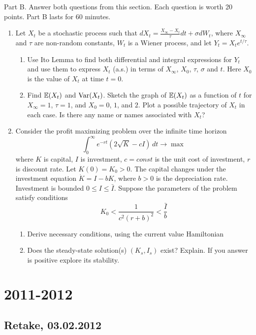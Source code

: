 \documentclass[pdftex,12pt,a4paper]{article}
\begin{document}
Part B.
Answer both questions from this section. Each question is worth 20 points.
Part B lasts for 60 minutes.
\begin{enumerate}
\item Let $X_t$ be a stochastic process such that
$dX_t=\frac{X_{\infty}-X_t}{\tau}dt+\sigma dW_t$, where $X_{\infty}$ and $\tau$ are non-random constants, $W_t$ is a Wiener process, and let $Y_t=X_t e^{t/\tau}$.
\begin{enumerate}
\item Use Ito Lemma to find both differential and integral expressions for $Y_t$ and use them to express $X_t$ (a.s.) in terms of $X_{\infty}$, $X_0$, $\tau$, $\sigma$ and $t$. Here $X_0$ is the value of $X_t$ at time $t=0$.
\item Find $\mathbb{E}(X_t)$ and $\operatorname{Var}(X_t)$. Sketch the graph of $\mathbb{E}(X_t)$ as a function of $t$ for $X_{\infty}=1$, $\tau=1$, and $X_0 = 0$, $1$, and $2$. Plot a possible trajectory of $X_t$ in each case. Is there any name or names associated with $X_t$? 
\end{enumerate}

\item Consider the profit maximizing problem over the infinite time horizon
\[
\int_0^{\infty} e^{-rt}(2\sqrt{K}-cI)\, dt \to \max
\]
where $K$ is capital, $I$ is investment, $c=const$ is the unit cost of investment, $r$ is discount rate. Let $K(0)=K_0>0$. The capital changes under the investment equation $\dot{K}=I-bK$, where $b>0$ is the depreciation rate. Investment is bounded $0\leq I\leq \bar{I}$. Suppose the parameters of the problem satisfy conditions
\[
K_0 < \frac{1}{c^2(r+b)^2} < \frac{\bar{I}}{b}
\]
\begin{enumerate}
\item Derive necessary conditions, using the current value Hamiltonian
\item Does the steady-state solution(s) $(K_s,I_s)$ exist? Explain. If you answer is positive explore its stability.
\end{enumerate}

\end{enumerate}


\section{2011-2012}

\subsection{Retake, 03.02.2012}
\end{document}

